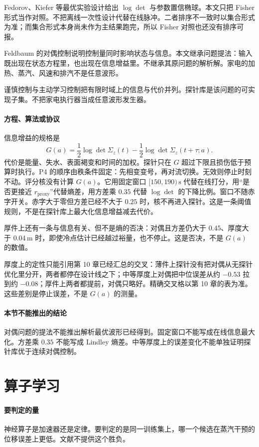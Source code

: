 Fedorov、Kiefer 等最优实验设计给出 $\log\det$ 与参数置信椭球。本文只把 Fisher 形式当作对照。不把离线一次性设计代替在线脉冲。二者排序不一致时以集合形式为准；而集合形式本身尚未作为主结果跑完，所以 Fisher 对照也还没有排序可报。

Feldbaum 的对偶控制说明控制量同时影响状态与信息\cite{feldbaum1965}。本文继承问题提法：输入既出现在状态方程里，也出现在信息增益里。不继承其原问题的解析解。家电的加热、蒸汽、风速和排汽不是任意波形。

谨慎控制与主动学习控制把有限时域上的信息与代价并列。探针库是该问题的可实现子集。不把家电执行器当成任意波形发生器。

\paragraph{方程、算法或协议}
信息增益的规格是
\[
G(a)=\frac12\log\det\Sigma_z(t)-\frac12\log\det\Sigma_z(t+\tau;a).
\]
代价是能量、失水、表面褐变和时间的加权。探针只在 $G$ 超过下限且损伤低于预算时执行。P4 的顺序由秩条件固定：先相变变号，再对流切换。无效则停止时刻不动。评分核没有计算 $G(a)$。它用固定窗口 $[150,190)\,\mathrm{s}$ 代替在线打分，用“是否更接近 $r_{\mathrm{proxy}}$”代替熵差，用方差乘 $0.35$ 代替 $\log\det$ 的下降比例。窗口不随赤字开关。赤字大于零但方差已经不大于 $0.25$ 时，核不再进入探针。这是一条阈值规则，不是在探针库上最大化信息增益减去代价。

厚件上还有一条与信息有关、但不是熵的否决：对偶且方差仍大于 $0.45$、厚度大于 $0.04\,\mathrm{m}$ 时，即使冷点估计已经越过裕量，也不停止。这是否决，不是 $G(a)$ 的数值。

厚度上的定性只能引用第 10 章已经汇总的交叉：薄件上探针没有把对偶从无探针优化里分开，两者都停在设计线之下；中等厚度上对偶把中位误差从约 $-0.53$ 拉到约 $-0.08$；厚件上两者都提前，对偶只略好。精确交叉格以第 10 章的表为准。这些差别是停止误差，不是 $G(a)$ 的测量。

\paragraph{本节不能推出的结论}
对偶问题的提法不能推出解析最优波形已经得到。固定窗口不能写成在线信息最大化。方差乘 $0.35$ 不能写成 Lindley 熵差。中等厚度上的误差变化不能单独证明探针库优于连续对偶控制。

\section{算子学习}

\paragraph{要判定的量}
神经算子是加速器还是定律。要判定的是同一训练集上，哪一个候选在蒸汽干预的位移误差上更低。文献不提供这个胜负。

